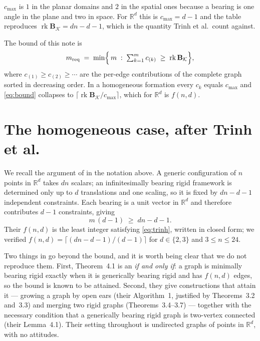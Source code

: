 \documentclass[11pt,a4paper]{article}
\theoremstyle{plain}
\theoremstyle{definition}
\newcommand{\R}{\mathbb{R}}
\newcommand{\rank}{\operatorname{rk}}
\begin{document}
$c_{\max}$ is $1$ in the planar domains and $2$ in the spatial ones because a
bearing is one angle in the plane and two in space. For $\R^d$ this is
$c_{\max}=d-1$ and the table reproduces $\rank\mathbf B_{\mathcal K}=dn-d-1$,
which is the quantity Trinh et al.\ count against.

The bound of this note is
\begin{equation}\label{eq:bound}
  m_{\text{req}}
  \;=\;\min\Bigl\{\,m\;:\;\textstyle\sum_{k=1}^{m}c_{(k)}
       \;\ge\;\rank\mathbf B_{\mathcal K}\Bigr\},
\end{equation}
where $c_{(1)}\ge c_{(2)}\ge\cdots$ are the per-edge contributions of the
complete graph sorted in decreasing order. In a homogeneous formation every
$c_k$ equals $c_{\max}$ and \eqref{eq:bound} collapses to
$\lceil \rank\mathbf B_{\mathcal K}/c_{\max}\rceil$, which for $\R^d$ is
$f(n,d)$.

\section{The homogeneous case, after Trinh et al.}

We recall the argument of \cite[Thm.~4.1]{trinh2020} in the notation above. A
generic configuration of $n$ points in $\R^d$ takes $dn$ scalars; an
infinitesimally bearing rigid framework is determined only up to $d$
translations and one scaling, so it is fixed by $dn-d-1$ independent
constraints. Each bearing is a unit vector in $\R^d$ and therefore contributes
$d-1$ constraints, giving
\begin{equation}\label{eq:trinh}
  m\,(d-1)\;\ge\;dn-d-1 .
\end{equation}
Their $f(n,d)$ is the least integer satisfying \eqref{eq:trinh}, written in
closed form; we verified $f(n,d)=\lceil (dn-d-1)/(d-1)\rceil$ for $d\in\{2,3\}$
and $3\le n\le 24$.

Two things in \cite{trinh2020} go beyond the bound, and it is worth being clear
that we do not reproduce them. First, Theorem~4.1 is an \emph{if and only if}:
a graph is minimally bearing rigid exactly when it is generically bearing rigid
and has $f(n,d)$ edges, so the bound is known to be attained. Second, they give
constructions that attain it --- growing a graph by open ears
(their Algorithm~1, justified by Theorems~3.2 and~3.3) and merging two rigid
graphs (Theorems~3.4--3.7) --- together with the necessary condition that a
generically bearing rigid graph is two-vertex connected (their Lemma~4.1).
Their setting throughout is undirected graphs of points in $\R^d$, with no
attitudes.
\end{document}

